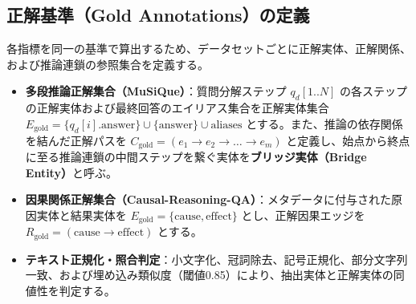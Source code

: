 \documentclass[a4j,dvipdfmx]{jsarticle}
\begin{document}
\subsection{正解基準（Gold Annotations）の定義}
各指標を同一の基準で算出するため、データセットごとに正解実体、正解関係、および推論連鎖の参照集合を定義する。
\begin{itemize}
    \item \textbf{多段推論正解集合（MuSiQue）}：質問分解ステップ $q_d[1..N]$ の各ステップの正解実体および最終回答のエイリアス集合を正解実体集合 $E_{\text{gold}} = \{q_d[i].\text{answer}\} \cup \{\text{answer}\} \cup \text{aliases}$ とする。また、推論の依存関係を結んだ正解パスを $C_{\text{gold}} = (e_1 \to e_2 \to \dots \to e_m)$ と定義し、始点から終点に至る推論連鎖の中間ステップを繋ぐ実体を\textbf{ブリッジ実体（Bridge Entity）}と呼ぶ。
    \item \textbf{因果関係正解集合（Causal-Reasoning-QA）}：メタデータに付与された原因実体と結果実体を $E_{\text{gold}} = \{\text{cause}, \text{effect}\}$ とし、正解因果エッジを $R_{\text{gold}} = (\text{cause} \to \text{effect})$ とする。
    \item \textbf{テキスト正規化・照合判定}：小文字化、冠詞除去、記号正規化、部分文字列一致、および埋め込み類似度（閾値0.85）により、抽出実体と正解実体の同値性を判定する。
\end{itemize}
\end{document}
